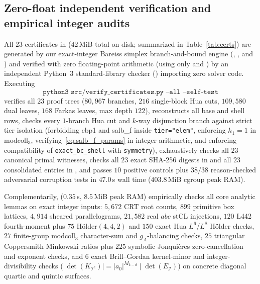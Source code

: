 \documentclass[11pt,a4paper]{amsart}
\theoremstyle{plain}
\theoremstyle{definition}
\theoremstyle{remark}
\begin{document}
\subsection{Zero-float independent verification and empirical integer audits}
All $23$ certificates in  ($42$\,MiB total on disk; summarized in Table~\ref{tab:certs}) are generated by our exact-integer Bareiss simplex branch-and-bound engine (, , and ) and verified with zero floating-point arithmetic (using only  and ) by an independent Python~3 standard-library checker () importing zero solver code. Executing
\[
  \texttt{python3 src/verify\_certificates.py --all --self-test}
\]
verifies all $23$ proof trees ($80{,}967$ branches, $216$ single-block Hua cuts, $109{,}580$ dual leaves, $168$ Farkas leaves, max depth $122$), reconstructs all base and shell rows, checks every $1$-branch Hua cut and $k$-way disjunction branch against strict tier isolation (forbidding \textsf{cbp1} and \textsf{salb\_f} inside \texttt{tier="elem"}, enforcing $h_1 = 1$ in \textsf{modcoll}$_3$, verifying~\eqref{eq:salb_f_params} in integer arithmetic, and enforcing compatibility of \texttt{exact\_bc\_shell} with \texttt{symmetry}), exhaustively checks all $23$ canonical primal witnesses, checks all $23$ exact SHA-256 digests in  and all $23$ consolidated entries in , and passes $10$ positive controls plus $38/38$ reason-checked adversarial corruption tests in $47.0$\,s wall time ($403.8$\,MiB cgroup peak RAM).

Complementarily,  ($0.35$\,s, $8.5$\,MiB peak RAM) empirically checks all core analytic lemmas on exact integer inputs: $5{,}672$ CRT root counts, $899$ primitive box lattices, $4{,}914$ sheared parallelograms, $21{,}582$ real $abc$ \textsf{stCL} injections, $120$ \textsf{L442} fourth-moment plus $75$ H\"older$(4,4,2)$ and $150$ exact \textsf{Hua} $L^6$/$L^8$ H\"older checks, $27$ finite-group \textsf{modcoll}$_3$ character-sum and $g_A$-balancing checks, $25$ triangular Coppersmith Minkowski ratios plus $225$ symbolic Jonqui\`eres zero-cancellation and exponent checks, and $6$ exact Brill--Gordan kernel-minor and integer-divisibility checks ($|\det(K_{\mathcal{I}^c})| = |a_0|^{M_{k-d}} \mid \det(E_{\mathcal{I}})$) on concrete diagonal quartic and quintic surfaces.
\end{document}
